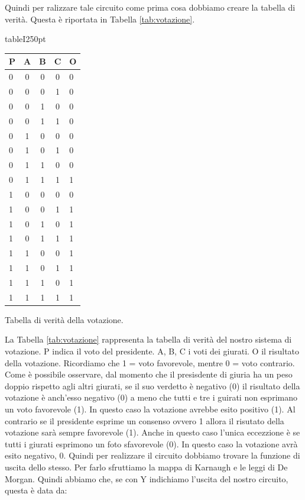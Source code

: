 Quindi per ralizzare tale circuito come prima cosa dobbiamo creare la tabella di verità. Questa è riportata in Tabella \ref{tab:votazione}.

\begin{wrapfloat}{table}{I}{250pt}
\centering
\begin{tabular}{l c c c | l}
	\toprule
		P & A & B & C & O \\
	\midrule
		0 & 0 & 0 & 0 & 0 \\
		0 & 0 & 0 & 1 & 0 \\
		0 & 0 & 1 & 0 & 0 \\
		0 & 0 & 1 & 1 & 0 \\
		0 & 1 & 0 & 0 & 0 \\
		0 & 1 & 0 & 1 & 0 \\
		0 & 1 & 1 & 0 & 0 \\
		0 & 1 & 1 & 1 & 1 \\
		1 & 0 & 0 & 0 & 0 \\
		1 & 0 & 0 & 1 & 1 \\
		1 & 0 & 1 & 0 & 1 \\
		1 & 0 & 1 & 1 & 1 \\
		1 & 1 & 0 & 0 & 1 \\
		1 & 1 & 0 & 1 & 1 \\
		1 & 1 & 1 & 0 & 1 \\
		1 & 1 & 1 & 1 & 1 \\
	\bottomrule
\end{tabular}
\caption{Tabella di verità della votazione.}
\label{tab:votazione}
\end{wrapfloat}

La Tabella \ref{tab:votazione} rappresenta la tabella di verità del nostro sistema di votazione.
P indica il voto del presidente. A, B, C i voti dei giurati. O il risultato della votazione. Ricordiamo che 1 = voto favorevole, mentre 0 = voto contrario.
Come è possibile osservare, dal momento che il presisdente di giuria ha un peso doppio rispetto agli altri giurati, se il suo verdetto è negativo (0) il risultato della votazione è anch'esso negativo (0) a meno che tutti e tre i guirati non esprimano un voto favorevole (1). In questo caso la votazione avrebbe esito positivo (1). Al contrario se il presidente esprime un consenso ovvero 1 allora il risutato della votazione sarà sempre favorevole (1). Anche in questo caso l'unica eccezzione è se tutti i giurati esprimono un foto sfavorevole (0). In questo caso la votazione avrà esito negativo, 0.
Quindi per realizzare il circuito dobbiamo trovare la funzione di uscita dello stesso. Per farlo sfruttiamo la mappa di Karnaugh e le leggi di De Morgan. Quindi abbiamo che, se con Y indichiamo l'uscita del nostro circuito, questa è data da:

